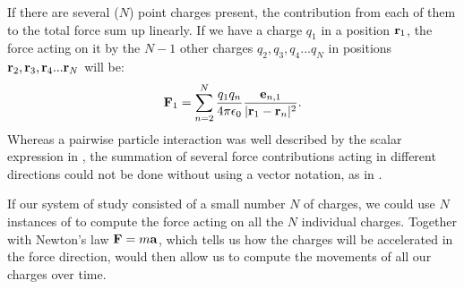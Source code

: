 If there are several ($N$) point charges present, the contribution from each of them to the total force sum up linearly. If we have a charge $q_1$ in a position ${\bf r}_1$, the force acting on it by the $N-1$ other charges $q_2, q_3, q_4 ... q_{N}$ in positions ${\bf r}_2, {\bf r}_3, {\bf r}_4 ... {\bf r}_{N}$ will be:
\begin{equation}
{\bf F}_1 = \sum_{n=2}^{N} \frac{q_1 q_n}{4\pi \epsilon_0} \frac{{{\bf e}}_{n,1}}{|{\bf r}_1-{\bf r}_n|^2}.
\label{eq:Basics:CoulombFN}
\end{equation}
Whereas a pairwise particle interaction was well described by the scalar expression in , the summation of several force contributions acting in different directions could not be done without using a vector notation, as in .

If our system of study consisted of a small number $N$ of charges, we could use $N$ instances of  to compute the force acting on all the $N$ individual charges. Together with Newton's law ${\bf F} = m {\bf a}$, which tells us how the charges will be accelerated in the force direction,  would then allow us to compute the movements of all our charges over time. 



